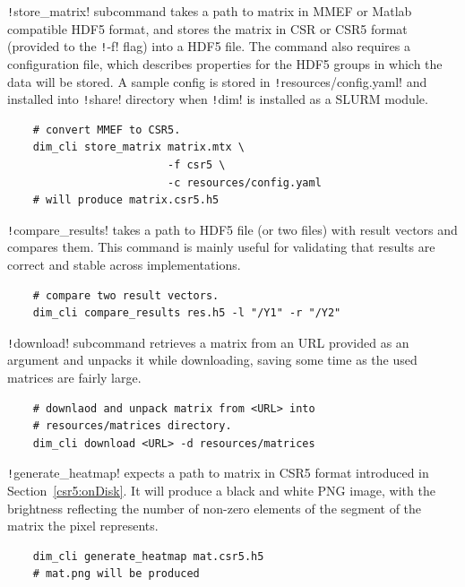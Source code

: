 \documentclass[thesis=M,english]{FITthesis}[2019/12/23]
\newcommand{\csre}[1]{\texttt!#1!}
\begin{document}
\csre{store_matrix} subcommand takes a path to matrix in MMEF or Matlab compatible HDF5 format, and stores
the matrix in CSR or CSR5 format (provided to the \csre{-f} flag) into a HDF5 file. The command also
requires a configuration file, which describes properties for the HDF5 groups in which the data will be
stored. A sample config is stored in \csre{resources/config.yaml} and installed into \csre{share} directory
when \csre{dim} is installed as a SLURM module.

\begin{verbatim}
    # convert MMEF to CSR5.
    dim_cli store_matrix matrix.mtx \
                         -f csr5 \
                         -c resources/config.yaml
    # will produce matrix.csr5.h5
\end{verbatim}

\csre{compare_results} takes a path to HDF5 file (or two files) with result vectors and compares them.
This command is mainly useful for validating that results are correct and stable across implementations.

\begin{verbatim}
    # compare two result vectors.
    dim_cli compare_results res.h5 -l "/Y1" -r "/Y2"
\end{verbatim}

\csre{download} subcommand retrieves a matrix from an URL provided as an argument and unpacks it while
downloading, saving some time as the used matrices are fairly large.

\begin{verbatim}
    # downlaod and unpack matrix from <URL> into 
    # resources/matrices directory.
    dim_cli download <URL> -d resources/matrices
\end{verbatim}

\csre{generate_heatmap} expects a path to matrix in CSR5 format introduced in Section~\ref{csr5:onDisk}.
It will produce a black and white PNG image, with the brightness reflecting the number of non-zero elements
of the segment of the matrix the pixel represents.

\begin{verbatim}
    dim_cli generate_heatmap mat.csr5.h5
    # mat.png will be produced
\end{verbatim}
\end{document}
